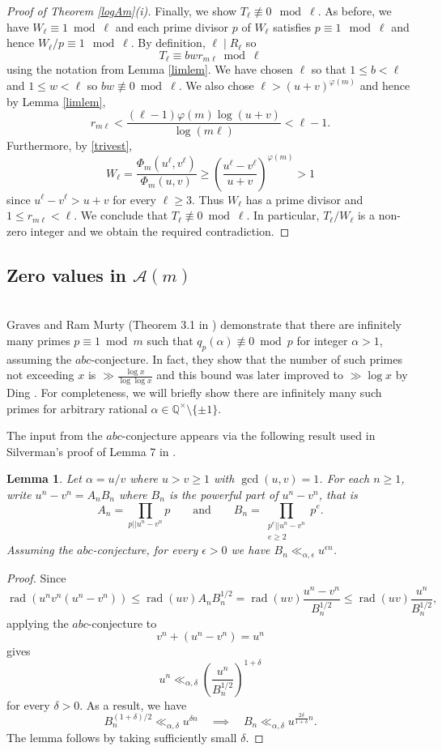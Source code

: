 \documentclass[12pt,reqno]{amsart}
\newtheorem{lemma}[theorem]{Lemma}
\theoremstyle{remark}
\newcommand{\cA}{\mathcal A}
\DeclareMathOperator{\rad}{rad}
\begin{document}
\begin{proof}[Proof of Theorem \ref{logAm}(i)]
Finally, we show $T_\ell\not\equiv 0\mod \ell$. 
As before, we have $W_\ell\equiv 1\bmod \ell$ and each prime divisor $p$ of $W_\ell$ satisfies $p\equiv 1\mod \ell$ and hence $W_\ell/p\equiv 1\mod\ell$. By definition, $\ell\mid R_\ell$ so
\[T_\ell\equiv bwr_{m\ell}\bmod \ell\]
using the notation from Lemma \ref{limlem}. We have chosen $\ell$ so that $1\leq b<\ell$ and $1\leq w<\ell$ so $bw\not\equiv 0\bmod\ell$. We also chose $\ell>(u+v)^{\varphi(m)}$ and hence by Lemma \ref{limlem}, 
\[r_{m\ell}<\frac{(\ell-1)\varphi(m)\log(u+v)}{\log(m\ell)}<\ell-1.\]
Furthermore, by \eqref{trivest}, 
\[W_\ell=\frac{\Phi_m(u^\ell,v^\ell)}{\Phi_m(u,v)}\geq\left(\frac{u^\ell-v^\ell}{u+v}\right)^{\varphi(m)}>1
\]
since $u^\ell-v^\ell>u+v$ for every $\ell\geq 3$. Thus $W_\ell$ has a prime divisor and $1\leq r_{m\ell}<\ell$. 
We conclude that $T_\ell\not\equiv 0\bmod \ell$. In particular, $T_\ell/W_\ell$ is a non-zero integer and we obtain the required contradiction.
\end{proof}

\subsection{Zero values in $\cA(m)$} $\,$\\[3pt]
Graves and Ram Murty (Theorem 3.1 in \cite{GRM13}) demonstrate that there are infinitely many primes $p\equiv 1\bmod m$ such that $q_p(\alpha)\not\equiv 0\bmod p$ for integer $\alpha>1$, assuming the $abc$-conjecture. In fact, they show that the number of such primes not exceeding $x$ is $\gg \frac{\log x}{\log\log x}$ and this bound was later improved to $\gg\log x$ by Ding \cite{D19}. For completeness, we will briefly show there are infinitely many such primes for arbitrary rational $\alpha\in\mathbb{Q}^\times\setminus\{\pm 1\}$. 

The input from the $abc$-conjecture appears via the following result used in Silverman's proof of Lemma 7 in \cite{Si88}.
\begin{lemma}\label{Silabc}
Let $\alpha=u/v$ where $u>v\geq 1$ with $\gcd(u,v)=1$. For each $n\geq 1$, write $u^n-v^n=A_nB_n$ where $B_n$ is the powerful part of $u^n-v^n$, that is
\[A_n=\prod_{p||u^n-v^n} p\qquad\text{and}\qquad 
  B_n=\prod_{\substack{p^e||u^n-v^n \\ e\geq 2}}p^e.\]
Assuming the $abc$-conjecture, for every $\epsilon>0$ we have
$B_n\ll_{\alpha,\epsilon} u^{\epsilon n}$.
\end{lemma}
\begin{proof}
Since
\[\rad(u^nv^n(u^n-v^n))\leq \rad(uv)A_nB_n^{1/2}=\rad(uv)\frac{u^n-v^n}{B_n^{1/2}}\leq\rad(uv)\frac{u^n}{B_n^{1/2}},\]
applying the $abc$-conjecture to
\[v^n+(u^n-v^n)=u^n\]
gives
\[u^n\ll_{\alpha,\delta}\left(\frac{u^n}{B_n^{1/2}}\right)^{1+\delta}\]
for every $\delta>0$. As a result, we have 
\[B_n^{(1+\delta)/2}\ll_{\alpha,\delta}u^{\delta n}\quad\implies\quad
B_n\ll_{\alpha,\delta}u^{\frac{2\delta}{1+\delta}n}.\]
The lemma follows by taking sufficiently small $\delta$. 
\end{proof}
\end{document}
